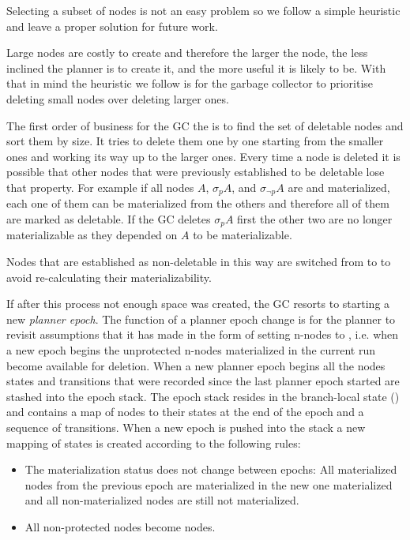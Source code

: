Selecting a subset of nodes is not an easy problem so we follow a
simple heuristic and leave a proper solution for future work.

%
%
Large nodes are costly to create and therefore the larger the node,
the less inclined the planner is to create it, and the more useful it
is likely to be. With that in mind the heuristic we follow is for the
garbage collector to prioritise deleting small nodes over deleting
larger ones.

The first order of business for the GC the is to find the set of
deletable nodes and sort them by size. It tries to delete them one by
one starting from the smaller ones and working its way up to the
larger ones. Every time a node is deleted it is possible that other
nodes that were previously established to be deletable lose that
property. For example if all nodes \(A\), \(\sigma_p A\), and
\(\sigma_{\neg p} A\) are  and materialized, each one of
them can be materialized from the others and therefore all of them are
marked as deletable. If the GC deletes \(\sigma_p A\) first the other
two are no longer materializable as they depended on \(A\) to be
materializable.


Nodes that are established as non-deletable in this way are switched
from  to  to avoid re-calculating their
materializability.

If after this process not enough space was created, the GC resorts to
starting a new \emph{planner epoch}. The function of a planner epoch
change is for the planner to revisit assumptions that it has made in
the form of setting n-nodes to , i.e. when a new
epoch begins the unprotected n-nodes materialized in the current run
become available for deletion. When a new planner epoch begins all the
nodes states and transitions that were recorded since the last planner
epoch started are stashed into the epoch stack. The epoch stack
resides in the branch-local state () and contains a map
of nodes to their states at the end of the epoch and a sequence of
transitions. When a new epoch is pushed into the stack a new mapping
of states is created according to the following rules:

\begin{itemize}
\item The materialization status does not change between epochs: All
  materialized nodes from the previous epoch are materialized in the
  new one materialized and all non-materialized nodes are still not
  materialized.
\item All non-protected  nodes become 
  nodes.
\end{itemize}

